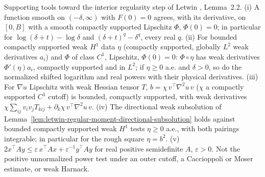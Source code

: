 \begin{lemma}
  \label{lem:letwin-rough-nonlinear-testing}
  \leanok
  Supporting tools toward the interior regularity step of Letwin \cite{Letwin2026QuadraticKLS}, Lemma~2.2.
  (i) A function smooth on $(-\delta,\infty)$ with $F(0)=0$ agrees, with its derivative, on $[0,B]$ with a smooth compactly supported
  Lipschitz $\Phi$, $\Phi(0)=0$; in particular for $\log(\delta+t)-\log\delta$ and $(\delta+t)^q-\delta^q$, every real $q$.
  (ii) For bounded compactly supported weak $H^1$ data $\eta$ (compactly supported, globally $L^2$ weak derivatives $a_i$) and $\Phi$ of class
  $C^1$, Lipschitz, $\Phi(0)=0$: $\Phi\circ\eta$ has weak derivatives $\Phi'(\eta)a_i$, compactly supported and in $L^2$; if $\eta\ge0$ a.e. and
  $\delta>0$, so do the normalized shifted logarithm and real powers with their physical derivatives.
  (iii) For $\nabla u$ Lipschitz with weak Hessian tensor $T$, $b=\chi\,v^{\top}\nabla^2u\,v$ ($\chi$ a compactly supported $C^1$ cutoff) is bounded,
  compactly supported, with weak derivatives $\chi\sum_{ij}v_iv_jT_{kij}+\partial_k\chi\,v^{\top}\nabla^2u\,v$.
  (iv) The directional weak subsolution of Lemma~\ref{lem:letwin-regular-moment-directional-subsolution} holds against bounded compactly supported
  weak $H^1$ tests $\eta\ge0$ a.e., with both pairings integrable; in particular for the rough square $\eta=b^2$.
  (v) $2x^{\top}Ay\le\varepsilon\,x^{\top}Ax+\varepsilon^{-1}y^{\top}Ay$ for real positive semidefinite $A$, $\varepsilon>0$.
  Not the positive unnormalized power test under an outer cutoff, a Caccioppoli or Moser estimate, or weak Harnack.
\end{lemma}
